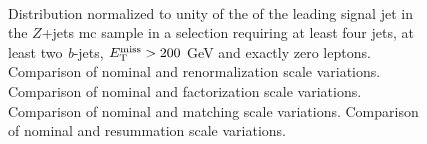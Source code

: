 \begin{figure}[h!]
\centering 
{}
\\
\caption{Distribution normalized to unity of the \pt of the leading signal jet in the $Z$+jets \gls{mc} sample in a selection requiring at least four jets, at least two \textit{b}-jets, $E_{\rm T}^{\mathrm{miss}}>200$ GeV and exactly zero leptons. 
 Comparison of nominal and renormalization scale variations.
 Comparison of nominal and factorization scale variations.
 Comparison of nominal and matching scale variations.
 Comparison of nominal and resummation scale variations.
}\label{fig:Z_met_0L_syst}
\end{figure}

